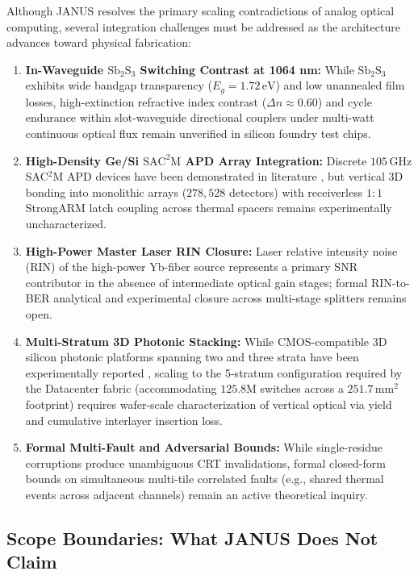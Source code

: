 \documentclass[journal]{IEEEtran}
\begin{document}
Although JANUS resolves the primary scaling contradictions of analog optical computing, several integration challenges must be addressed as the architecture advances toward physical fabrication:
\begin{enumerate}
\item \textbf{In-Waveguide $\mathrm{Sb_2S_3}$ Switching Contrast at 1064 nm:} While $\mathrm{Sb_2S_3}$ exhibits wide bandgap transparency ($E_g = 1.72\,\mathrm{eV}$) and low unannealed film losses, high-extinction refractive index contrast ($\Delta n \approx 0.60$) and cycle endurance within slot-waveguide directional couplers under multi-watt continuous optical flux remain unverified in silicon foundry test chips.
\item \textbf{High-Density Ge/Si $\mathrm{SAC^2M}$ APD Array Integration:} Discrete $105\,\mathrm{GHz}$ SAC$^2$M APD devices have been demonstrated in literature \cite{Chen2025}, but vertical 3D bonding into monolithic arrays ($278,528$ detectors) with receiverless $1:1$ StrongARM latch coupling across thermal spacers remains experimentally uncharacterized.
\item \textbf{High-Power Master Laser RIN Closure:} Laser relative intensity noise (RIN) of the high-power Yb-fiber source represents a primary SNR contributor in the absence of intermediate optical gain stages; formal RIN-to-BER analytical and experimental closure across multi-stage splitters remains open.
\item \textbf{Multi-Stratum 3D Photonic Stacking:} While CMOS-compatible 3D silicon photonic platforms spanning two and three strata have been experimentally reported \cite{Feldmann2019}, scaling to the 5-stratum configuration required by the Datacenter fabric (accommodating $125.8\text{M}$ switches across a $251.7\,\mathrm{mm}^2$ footprint) requires wafer-scale characterization of vertical optical via yield and cumulative interlayer insertion loss.
\item \textbf{Formal Multi-Fault and Adversarial Bounds:} While single-residue corruptions produce unambiguous CRT invalidations, formal closed-form bounds on simultaneous multi-tile correlated faults (e.g., shared thermal events across adjacent channels) remain an active theoretical inquiry.
\end{enumerate}

\subsection{\textbf{Scope Boundaries: What JANUS Does Not Claim}}
\label{sec:scope_boundaries}
\end{document}
